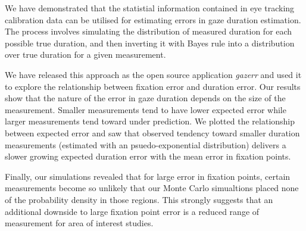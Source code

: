 \documentclass[12pt,a4paper]{article}
\numberwithin{equation}{section}
\begin{document}
We have demonstrated that the statistial information contained in eye tracking calibration
data can be utilised for estimating errors in gaze duration estimation. The process involves
simulating the distribution of measured duration for each possible true duration, 
and then inverting it with Bayes rule into a distribution over true duration for a given measurement.

We have released this approach as the open source application \textit{gazerr} and used it to explore
the relationship between fixation error and duration error. Our results show that the nature
of the error in gaze duration depends on the size of the measurement. Smaller measurements
tend to have lower expected error while larger measurements tend toward under prediction. We plotted
the relationship between expected error and saw that observed tendency toward smaller duration
measurements (estimated with an psuedo-exponential distribution) delivers a slower growing
expected duration error with the mean error in fixation points.

Finally, our simulations revealed that for large error in fixation points, certain measurements
become so unlikely that our Monte Carlo simualtions placed none of the probability density
in those regions. This strongly suggests that an additional downside to large fixation point error
is a reduced range of measurement for area of interest studies.



\end{document}
